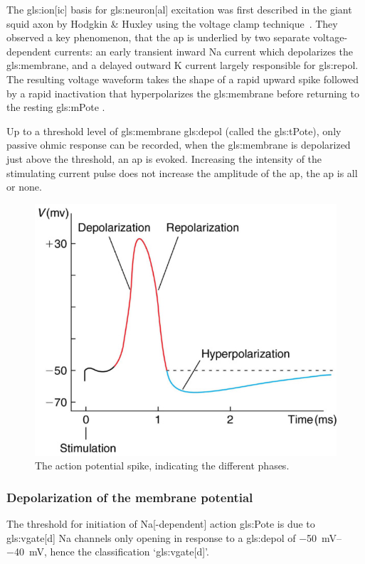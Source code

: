 \documentclass[class={myRUCProject}, crop=false]{standalone}
\begin{document}
The \gls{gls:ion}[ic] basis for \gls{gls:neuron}[al] excitation was first described in the giant squid axon by Hodgkin \& Huxley  using the voltage clamp technique~\cite{HodHux1952}. They observed a key phenomenon, that the \gls{ap} is underlied by two separate voltage-dependent currents: an early transient inward \gls{Na} current which depolarizes the \gls{gls:membrane}, and a delayed outward \gls{K} current largely responsible for \gls{gls:repol}. 
The resulting voltage waveform takes the shape of a rapid upward spike followed by a rapid inactivation that hyperpolarizes the \gls{gls:membrane} before returning to the resting \gls{gls:mPote} .

Up to a threshold level of \gls{gls:membrane} \gls{gls:depol} (called the \gls{gls:tPote}), only passive ohmic response can be recorded, when the \gls{gls:membrane} is depolarized just above the threshold, an \gls{ap} is evoked. 
Increasing the intensity of the stimulating current pulse does not increase the amplitude of the \gls{ap}, the \gls{ap} is all or none. 
\begin{figure}[H]
  \centering
  \includegraphics[width=0.5\linewidth]{Pictures//Anakin/AP.png}
  \caption{The action potential spike, indicating the different phases.}\label{fig:AP}
\end{figure}

\subsubsection{Depolarization of the membrane potential}
The threshold for initiation of \gls{Na}[-dependent] action \gls{gls:Pote} is due to \gls{gls:vgate}[d] \gls{Na} channels only opening in response to a \gls{gls:depol} of \qtyrange{-50}{-40}{\mV}, hence the classification `\gls{gls:vgate}[d]'. 
\end{document}

